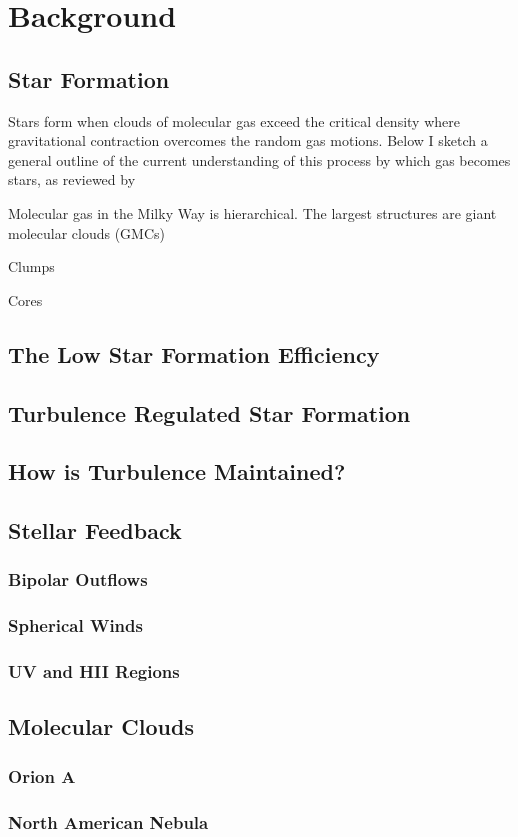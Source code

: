\section{Background}

\subsection{Star Formation}
Stars form when clouds of molecular gas exceed the critical density where gravitational contraction overcomes the random gas motions. Below I sketch a general outline of the current understanding of this process by which gas becomes stars, as reviewed by 

Molecular gas in the Milky Way is hierarchical. The largest structures are giant molecular clouds (GMCs)

Clumps

Cores

\subsection{The Low Star Formation Efficiency}

\subsection{Turbulence Regulated Star Formation}

\subsection{How is Turbulence Maintained?}

\subsection{Stellar Feedback}

\subsubsection{Bipolar Outflows}

\subsubsection{Spherical Winds}

\subsubsection{UV and HII Regions}

\subsection{Molecular Clouds}

\subsubsection{Orion A}

\subsubsection{North American Nebula}
  
  
  